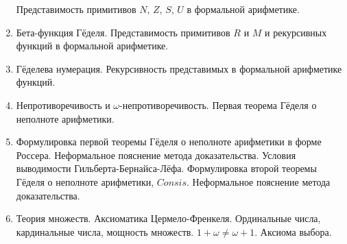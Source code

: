 \documentclass[11pt,a4paper,oneside]{scrartcl}
\begin{document}
\begin{enumerate}
Представимость примитивов $N$, $Z$, $S$, $U$ в формальной арифметике.
\item Бета-функция Гёделя. Представимость примитивов $R$ и $M$ и рекурсивных функций в формальной арифметике.
\item Гёделева нумерация. Рекурсивность представимых в формальной арифметике функций.
\item Непротиворечивость и $\omega$-непротиворечивость. Первая теорема Гёделя о неполноте арифметики.
\item Формулировка первой теоремы Гёделя о неполноте арифметики в форме Россера. Неформальное пояснение метода
доказательства.
Условия выводимости Гильберта-Бернайса-Лёфа. Формулировка второй теоремы Гёделя о неполноте арифметики, $Consis$. 
Неформальное пояснение метода доказательства.
\item Теория множеств. Аксиоматика Цермело-Френкеля. Ординальные числа, кардинальные числа, мощность множеств. 
$1+\omega\ne\omega+1$. Аксиома выбора.
\end{enumerate}
\end{document}

